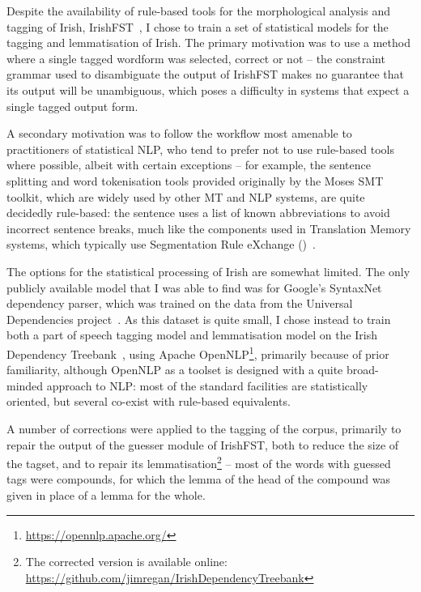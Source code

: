 Despite the availability of rule-based tools for the morphological analysis and tagging of Irish, IrishFST~\citep{elain09}, 
I chose to train a set of statistical models for the tagging and lemmatisation of Irish. 
The primary motivation was to use a method where a single tagged wordform was selected, correct or not -- the constraint
grammar used to disambiguate the output of IrishFST makes no guarantee that its output will be unambiguous, which poses
a difficulty in systems that expect a single tagged output form.

A secondary motivation was to follow the workflow most amenable to practitioners of statistical NLP, who tend to prefer not 
to use rule-based tools where possible, albeit with certain exceptions -- for example, the sentence splitting and word tokenisation
tools provided originally by the Moses SMT toolkit, which are widely used by other MT and NLP systems, are quite
decidedly rule-based: the sentence uses a list of known abbreviations to avoid incorrect sentence breaks, much like
the components used in Translation Memory systems, which typically use Segmentation Rule eXchange ()~\citep{milkowski09srx}.

The options for the statistical processing of Irish are somewhat limited. The only publicly available
model that I was able to find was for Google's SyntaxNet dependency parser, which was trained on the
data from the Universal Dependencies project~\citep{lynn2016universal}. As this dataset is quite small,
I chose instead to train both a part of speech tagging model and lemmatisation model on the Irish Dependency Treebank~\citep{lynn16treebank},
using Apache  OpenNLP\footnote{\href{https://opennlp.apache.org/}{https://opennlp.apache.org/}}, primarily because of prior
familiarity, although OpenNLP as a toolset is designed with a quite broad-minded approach to NLP: most of
the standard facilities are statistically oriented, but several co-exist with rule-based equivalents.

A number of corrections were applied to the tagging of the corpus, primarily to repair the output of
the guesser module of IrishFST, both to reduce the size of the tagset, and to repair its 
lemmatisation\footnote{The corrected version is available online: \href{https://github.com/jimregan/IrishDependencyTreebank}{https://github.com/jimregan/IrishDependencyTreebank}} -- 
most of the words with guessed tags were compounds, for which the lemma of the head of the compound was
given in place of a lemma for the whole.

